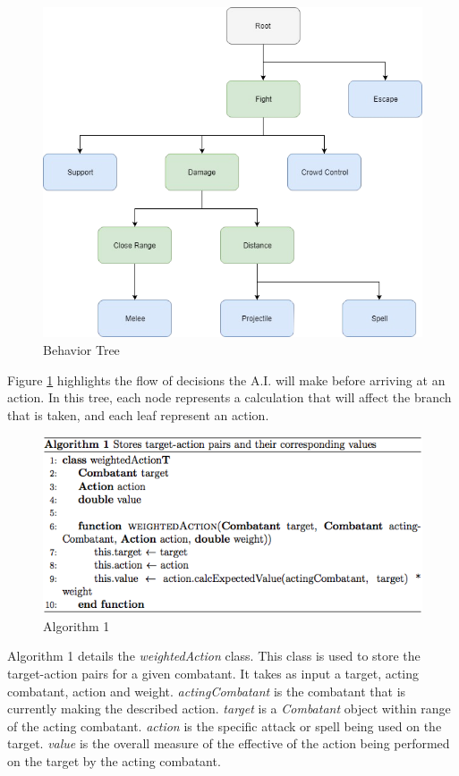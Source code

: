 \documentclass[letterpaper, 10 pt, conference]{ieeeconf}
\begin{document}
\begin{figure}[H]
	\centering
	\centerline{\includegraphics[scale=.35]{behavior_tree}}
	\caption{Behavior Tree}
	\label{fig: Behavior Tree}
\end{figure}
Figure \ref{fig: Behavior Tree} highlights the flow of decisions the A.I. will make before arriving
at an action. In this tree, each node represents a calculation that will affect the
branch that is taken, and each leaf represent an action.
\begin{figure}[H]
	\centering
	\centerline{\includegraphics[scale=.37]{algorithm_1}}
	\caption{Algorithm 1}
	\label{fig: Algorithm 1}
\end{figure}
Algorithm 1 details the \textit{weightedAction} class. This class is used to store the
target-action pairs for a given combatant. It takes as input a target, acting combatant,
action and weight. \textit{actingCombatant} is the combatant that is currently
making the described action. \textit{target} is a \textit{Combatant} object within range of the acting combatant. \textit{action} is the specific attack or spell being used on the target.
\textit{value} is the overall measure of the effective of the action being performed on the
target by the acting combatant.
\end{document}
